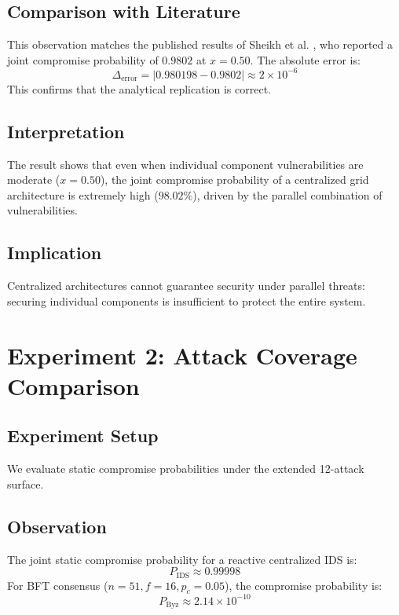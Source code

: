 \documentclass[12pt, oneside, a4paper]{report}
\theoremstyle{definition}
\theoremstyle{remark}
\newcommand{\Pbyz}{P_{\mathrm{Byz}}}
\newcommand{\Pids}{P_{\mathrm{IDS}}}
\begin{document}
\subsection{Comparison with Literature}
This observation matches the published results of Sheikh et al. \cite{sheikh2020}, who reported a joint compromise probability of $0.9802$ at $x=0.50$. The absolute error is:
\begin{equation}
\Delta_{\mathrm{error}} = | 0.980198 - 0.9802 | \approx 2 \times 10^{-6}
\end{equation}
This confirms that the analytical replication is correct.

\subsection{Interpretation}
The result shows that even when individual component vulnerabilities are moderate ($x = 0.50$), the joint compromise probability of a centralized grid architecture is extremely high ($98.02\%$), driven by the parallel combination of vulnerabilities.

\subsection{Implication}
Centralized architectures cannot guarantee security under parallel threats: securing individual components is insufficient to protect the entire system.

\bigskip

\section{Experiment 2: Attack Coverage Comparison}
\label{sec:res:e2}

\subsection{Experiment Setup}
We evaluate static compromise probabilities under the extended 12-attack surface.

\subsection{Observation}
The joint static compromise probability for a reactive centralized IDS is:
\begin{equation}
\Pids \approx 0.99998
\end{equation}
For BFT consensus ($n=51, f=16, p_c=0.05$), the compromise probability is:
\begin{equation}
\Pbyz \approx 2.14 \times 10^{-10}
\end{equation}
\end{document}
